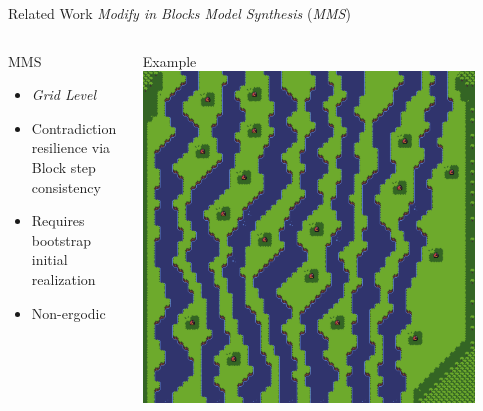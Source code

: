 \documentclass{beamer}
\begin{document}
  \begin{frame}[fragile]{Related Work}
    \textit{Modify in Blocks Model Synthesis} (\textit{MMS})
    \begin{columns}[T,onlytextwidth]
        \begin{block}{MMS}
          \hfill \\
          \begin{itemize}
            \item \textit{Grid Level}
            \item Contradiction resilience via
              Block step consistency
            \item Requires bootstrap initial realization
            \item Non-ergodic
          \end{itemize}
        \end{block}
        \begin{block}{Example}
          \includegraphics[width=0.9\textwidth]{img/forestmicro_64x64.pdf}
        \end{block}
    \end{columns}
  \end{frame}

\end{document}
